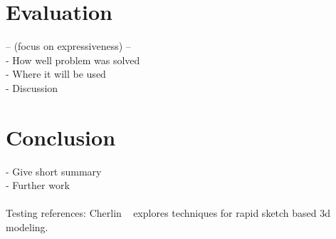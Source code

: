 \documentclass[a4paper,10pt]{article}
\begin{document}
\section{Evaluation}
 -- (focus on expressiveness) -- \\
- How well problem was solved\\
- Where it will be used \\
- Discussion

\section{Conclusion}
- Give short summary\\
- Further work\\
\\


Testing references: Cherlin ~\cite{Cherlin:2005:SMF:1090122.1090145} explores techniques for rapid sketch based 3d modeling.


{}

\end{document}
